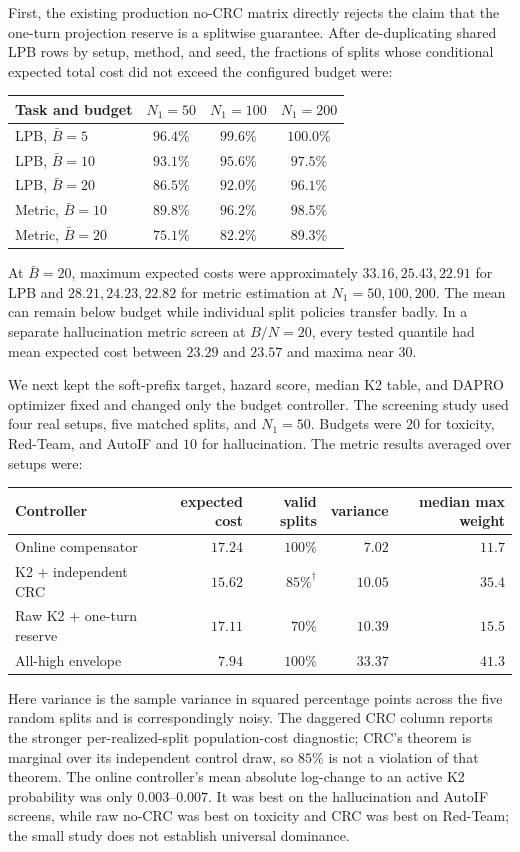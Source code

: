 First, the existing production no-CRC matrix directly rejects the claim that
the one-turn projection reserve is a splitwise guarantee.  After de-duplicating
shared LPB rows by setup, method, and seed, the fractions of splits whose
conditional expected total cost did not exceed the configured budget were:
\begin{center}
\begin{tabular}{lccc}
\toprule
Task and budget & $N_1=50$ & $N_1=100$ & $N_1=200$\\
\midrule
LPB, $\bar B=5$  & $96.4\%$ & $99.6\%$ & $100.0\%$\\
LPB, $\bar B=10$ & $93.1\%$ & $95.6\%$ & $97.5\%$\\
LPB, $\bar B=20$ & $86.5\%$ & $92.0\%$ & $96.1\%$\\
Metric, $\bar B=10$ & $89.8\%$ & $96.2\%$ & $98.5\%$\\
Metric, $\bar B=20$ & $75.1\%$ & $82.2\%$ & $89.3\%$\\
\bottomrule
\end{tabular}
\end{center}
At $\bar B=20$, maximum expected costs were approximately
$33.16,25.43,22.91$ for LPB and $28.21,24.23,22.82$ for metric estimation at
$N_1=50,100,200$.  The mean can remain below budget while individual split
policies transfer badly.  In a separate hallucination metric screen at
$B/N=20$, every tested quantile had mean expected cost between $23.29$ and
$23.57$ and maxima near $30$.

We next kept the soft-prefix target, hazard score, median K2 table, and DAPRO
optimizer fixed and changed only the budget controller.  The screening study
used four real setups, five matched splits, and $N_1=50$.  Budgets were $20$
for toxicity, Red-Team, and AutoIF and $10$ for hallucination.  The metric
results averaged over setups were:
\begin{center}
\begin{tabular}{lrrrr}
\toprule
Controller & expected cost & valid splits & variance & median max weight\\
\midrule
Online compensator & $17.24$ & $100\%$ & $7.02$ & $11.7$\\
K2 + independent CRC & $15.62$ & $85\%^{\dagger}$ & $10.05$ & $35.4$\\
Raw K2 + one-turn reserve & $17.11$ & $70\%$ & $10.39$ & $15.5$\\
All-high envelope & $7.94$ & $100\%$ & $33.37$ & $41.3$\\
\bottomrule
\end{tabular}
\end{center}
Here variance is the sample variance in squared percentage points across the
five random splits and is correspondingly noisy.  The daggered CRC column
reports the stronger per-realized-split population-cost diagnostic; CRC's
theorem is marginal over its independent control draw, so $85\%$ is not a
violation of that theorem.  The online controller's mean absolute log-change
to an active K2 probability was only $0.003$--$0.007$.  It was best on the
hallucination and AutoIF screens, while raw no-CRC was best on toxicity and
CRC was best on Red-Team; the small study does not establish universal
dominance.

